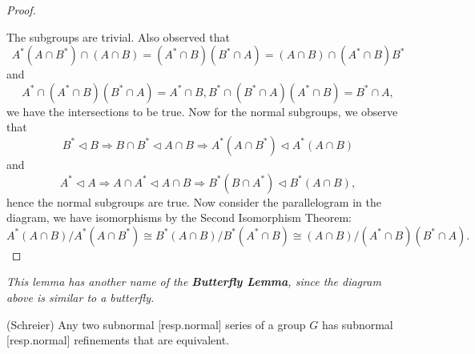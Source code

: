 \begin{proof}
\begin{center}
\begin{tikzpicture}[x=0.75pt,y=0.75pt,yscale=-1,xscale=1]
\end{tikzpicture}
\end{center}
The subgroups are trivial. Also observed that 
$$
A^*\left( A\cap B^* \right) \cap \left( A\cap B \right) =\left( A^*\cap B \right) \left( B^*\cap A \right) =\left( A\cap B \right) \cap \left( A^*\cap B \right) B^*
$$
and 
$$
A^*\cap \left( A^*\cap B \right) \left( B^*\cap A \right) =A^*\cap B,B^*\cap \left( B^*\cap A \right) \left( A^*\cap B \right) =B^*\cap A,
$$
we have the intersections to be true. Now for the normal subgroups, we observe that 
$$
B^*\lhd B\Rightarrow B\cap B^*\lhd A\cap B\Rightarrow A^*\left( A\cap B^* \right) \lhd A^*\left( A\cap B \right) 
$$
and 
$$
A^*\lhd A\Rightarrow A\cap A^*\lhd A\cap B\Rightarrow B^*\left( B\cap A^* \right) \lhd B^*\left( A\cap B \right) ,
$$
hence the normal subgroups are true. Now consider the parallelogram in the diagram, we have isomorphisms by the Second Isomorphism Theorem: 
$$
A^*\left( A\cap B \right) /A^*\left( A\cap B^* \right) \cong B^*\left( A\cap B \right) /B^*\left( A^*\cap B \right) \cong \left( A\cap B \right) /\left( A^*\cap B \right) \left( B^*\cap A \right) .
$$
\end{proof}
\begin{note}\em
This lemma has another name of the \textbf{Butterfly Lemma}, since the diagram above is similar to a butterfly.
\end{note}
\begin{theorem}(Schreier)
Any two subnormal [resp.normal] series of a group $G$ has subnormal [resp.normal] refinements that are equivalent.
\end{theorem}

